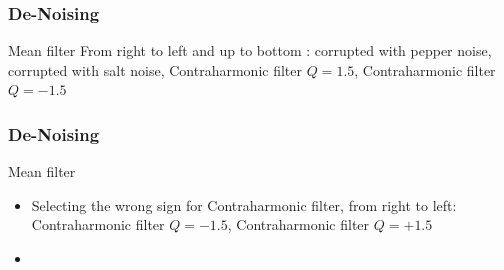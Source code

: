 \documentclass{beamer}
\begin{document}
\begin{frame}
\frametitle{De-Noising}
\begin{block}{Mean filter}
\scriptsize{From right to left and up to bottom : corrupted with pepper noise, corrupted with salt noise, Contraharmonic filter $Q = 1.5$, Contraharmonic filter $Q = -1.5$}\\
\end{block}
\end{frame}
\begin{frame}
\frametitle{De-Noising}
\begin{block}{Mean filter}
\begin{itemize}
	\item \scriptsize{Selecting the wrong sign for Contraharmonic filter, from right to left: Contraharmonic filter $Q = -1.5$, Contraharmonic filter $Q = +1.5$}
	\item [] 
\end{itemize}
\end{block}
\end{frame}
\end{document}
